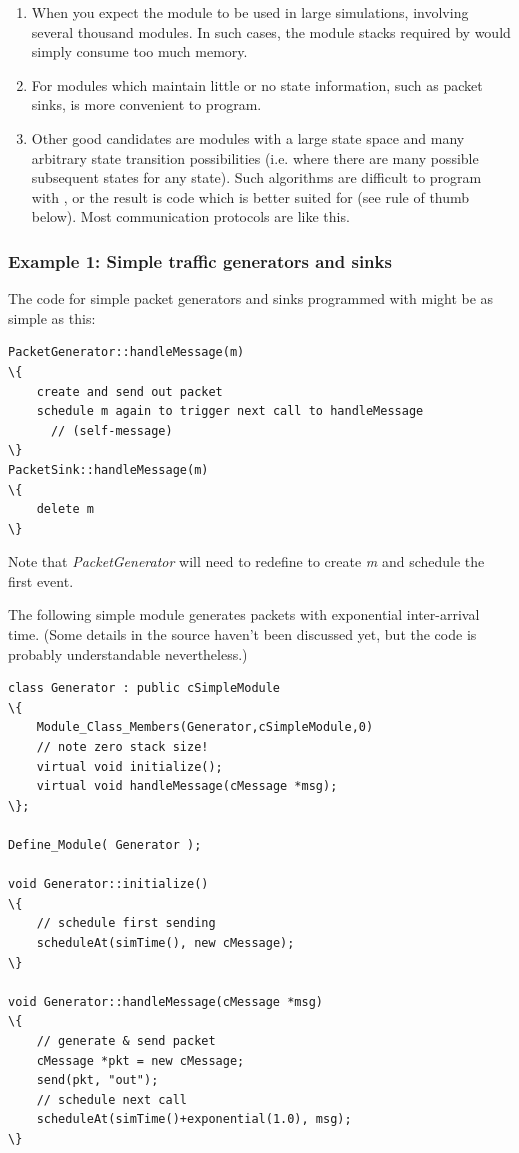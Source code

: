 \begin{enumerate}
  \item{When you expect the module to be used in large simulations,
      involving several thousand modules. In such cases, the module stacks
      required by  would simply consume too much memory.}
  \item{For modules which maintain little or no state information,
      such as packet sinks,  is more convenient to program.}
  \item{Other good candidates are modules with a large state space and
      many arbitrary state transition possibilities (i.e. where there
      are many possible subsequent states for any state). Such algorithms
      are difficult to program with , or the result is code
      which is better suited for  (see rule of thumb
      below). Most communication protocols are like this.}
\end{enumerate}



\subsubsection{Example 1: Simple traffic generators and sinks}


The code for simple packet generators and sinks programmed with  might
be as simple as this:

\begin{Verbatim}[commandchars=\\\{\}]
PacketGenerator::handleMessage(m)
\{
    create and send out packet
    schedule m again to trigger next call to handleMessage
      // (self-message)
\}
PacketSink::handleMessage(m)
\{
    delete m
\}
\end{Verbatim}



Note that \textit{PacketGenerator} will need to redefine 
to create \textit{m} and schedule the first event.

The following simple module generates packets with exponential
inter-arrival time. (Some details in the source haven't been
discussed yet, but the code is probably understandable nevertheless.)


\begin{Verbatim}[commandchars=\\\{\}]
class Generator : public cSimpleModule
\{
    Module_Class_Members(Generator,cSimpleModule,0)
    // note zero stack size!
    virtual void initialize();
    virtual void handleMessage(cMessage *msg);
\};

Define_Module( Generator );

void Generator::initialize()
\{
    // schedule first sending
    scheduleAt(simTime(), new cMessage);
\}

void Generator::handleMessage(cMessage *msg)
\{
    // generate & send packet
    cMessage *pkt = new cMessage;
    send(pkt, "out");
    // schedule next call
    scheduleAt(simTime()+exponential(1.0), msg);
\}
\end{Verbatim}



